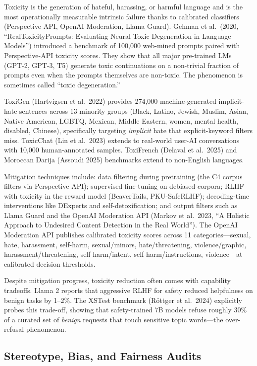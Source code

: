 Toxicity is the generation of hateful, harassing, or harmful language and is the most operationally measurable intrinsic failure thanks to calibrated classifiers (Perspective API, OpenAI Moderation, Llama Guard). Gehman et al.~(2020, ``RealToxicityPrompts: Evaluating Neural Toxic Degeneration in Language Models'') introduced a benchmark of 100,000 web-mined prompts paired with Perspective-API toxicity scores. They show that all major pre-trained LMs (GPT-2, GPT-3, T5) generate toxic continuations on a non-trivial fraction of prompts even when the prompts themselves are non-toxic. The phenomenon is sometimes called ``toxic degeneration.''

ToxiGen (Hartvigsen et al.~2022) provides 274,000 machine-generated implicit-hate sentences across 13 minority groups (Black, Latino, Jewish, Muslim, Asian, Native American, LGBTQ, Mexican, Middle Eastern, women, mental health, disabled, Chinese), specifically targeting \emph{implicit} hate that explicit-keyword filters miss. ToxicChat (Lin et al.~2023) extends to real-world user-AI conversations with 10,000 human-annotated samples. ToxiFrench (Delaval et al.~2025) and Moroccan Darija (Assoudi 2025) benchmarks extend to non-English languages.

Mitigation techniques include: data filtering during pretraining (the C4 corpus filters via Perspective API); supervised fine-tuning on debiased corpora; RLHF with toxicity in the reward model (BeaverTails, PKU-SafeRLHF); decoding-time interventions like DExperts and self-detoxification; and output filters such as Llama Guard and the OpenAI Moderation API (Markov et al.~2023, ``A Holistic Approach to Undesired Content Detection in the Real World''). The OpenAI Moderation API publishes calibrated toxicity scores across 11 categories---sexual, hate, harassment, self-harm, sexual/minors, hate/threatening, violence/graphic, harassment/threatening, self-harm/intent, self-harm/instructions, violence---at calibrated decision thresholds.

Despite mitigation progress, toxicity reduction often comes with capability tradeoffs. Llama 2 reports that aggressive RLHF for safety reduced helpfulness on benign tasks by 1--2\%. The XSTest benchmark (Röttger et al.~2024) explicitly probes this trade-off, showing that safety-trained 7B models refuse roughly 30\% of a curated set of \emph{benign} requests that touch sensitive topic words---the over-refusal phenomenon.

\subsection{Stereotype, Bias, and Fairness Audits}\label{stereotype-bias-and-fairness-audits}

